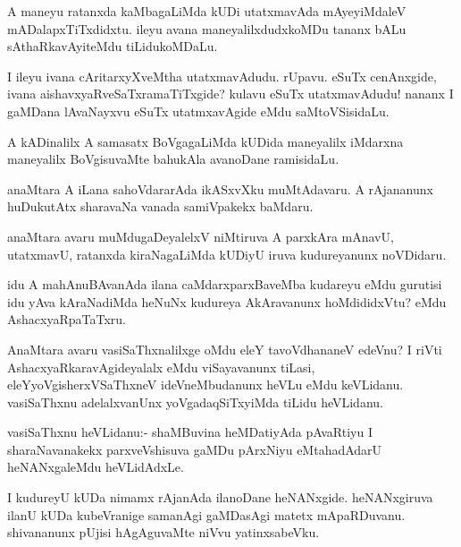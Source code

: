 \documentclass{article}
\begin{document}
\begin{mn}%
A maneyu ratanxda kaMbagaLiMda kUDi utatxmavAda mAyeyiMdaleV
mADalapxTiTxdidxtu. ileyu avana maneyalilxdudxkoMDu tananx bALu
sAthaRkavAyiteMdu tiLidukoMDaLu.
\end{mn}

\begin{mn}
I ileyu ivana cAritarxyXveMtha utatxmavAdudu. rUpavu. eSuTx
cenAnxgide, ivana aishavxyaRveSaTxramaTiTxgide? kulavu eSuTx
utatxmavAdudu! nananx I gaMDana lAvaNayxvu eSuTx utatmxavAgide eMdu saMtoVSisidaLu.
\end{mn}

\begin{mn}%
A kADinalilx A samasatx BoVgagaLiMda kUDida maneyalilx iMdarxna
maneyalilx BoVgisuvaMte bahukAla avanoDane ramisidaLu.
\end{mn}

\begin{mn}
anaMtara A iLana sahoVdararAda ikASxvXku muMtAdavaru. A rAjananunx
huDukutAtx sharavaNa vanada samiVpakekx baMdaru.
\end{mn}

\begin{mn}
anaMtara avaru muMdugaDeyalelxV niMtiruva A parxkAra mAnavU,
utatxmavU, ratanxda kiraNagaLiMda kUDiyU iruva kudureyanunx noVDidaru.
\end{mn}

\begin{mn}
idu A mahAnuBAvanAda ilana caMdarxparxBaveMba kudareyu eMdu gurutisi
idu yAva kAraNadiMda heNuNx kudureya AkAravanunx hoMdididxVtu? eMdu AshacxyaRpaTaTxru.
\end{mn}

\begin{mn}%
AnaMtara avaru vasiSaThxnalilxge oMdu eleY tavoVdhananeV edeVnu? I
riVti AshacxyaRkaravAgideyalalx eMdu viSayavanunx tiLasi,
eleYyoVgisherxVSaThxneV ideVneMbudanunx heVLu eMdu
keVLidanu. vasiSaThxnu adelalxvanUnx yoVgadaqSiTxyiMda tiLidu heVLidanu.
\end{mn}

\begin{mn}%
vasiSaThxnu heVLidanu:- shaMBuvina heMDatiyAda pAvaRtiyu I
sharaNavanakekx parxveVshisuva gaMDu pArxNiyu eMtahadAdarU
heNANxgaleMdu heVLidAdxLe.
\end{mn}

\begin{mn}
I kudureyU kUDa nimamx rAjanAda ilanoDane heNANxgide. heNANxgiruva
ilanU kUDa kubeVranige samanAgi gaMDasAgi matetx
mApaRDuvanu. shivananunx pUjisi hAgAguvaMte niVvu yatinxsabeVku.
\end{mn}
\end{document}
